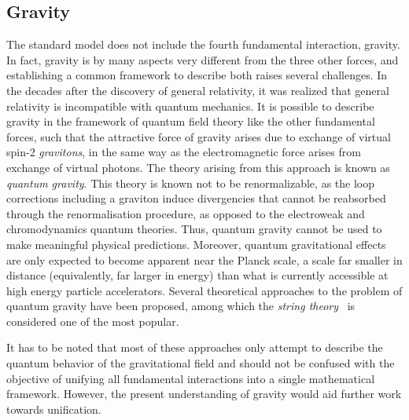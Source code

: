 \subsection*{Gravity}

The standard model does not include the fourth fundamental interaction, gravity.
In fact, gravity is by many aspects very different from the three other forces, and establishing a common framework to describe both raises several challenges.
In the decades after the discovery of general relativity, it was realized that general relativity is incompatible with quantum mechanics.
It is possible to describe gravity in the framework of quantum field theory like the other fundamental forces, such that the attractive force of gravity arises due to exchange of virtual spin-2 \textit{gravitons}, in the same way as the electromagnetic force arises from exchange of virtual photons. The theory arising from this approach is known as \textit{quantum gravity}.
This theory is known not to be renormalizable, as the loop corrections including a graviton induce divergencies that cannot be reabsorbed through the renormalisation procedure, as opposed to the electroweak and chromodynamics quantum theories. Thus, quantum gravity cannot be used to make meaningful physical predictions.
Moreover, quantum gravitational effects are only expected to become apparent near the Planck scale, a scale far smaller in distance (equivalently, far larger in energy) than what is currently accessible at high energy particle accelerators.
Several theoretical approaches to the problem of quantum gravity have been proposed, among which the \textit{string theory}~\cite{StringTheory} is considered one of the most popular.

It has to be noted that most of these approaches only attempt to describe the quantum behavior of the gravitational field and should not be confused with the objective of unifying all fundamental interactions into a single mathematical framework. However, the present understanding of gravity would aid further work towards unification.

